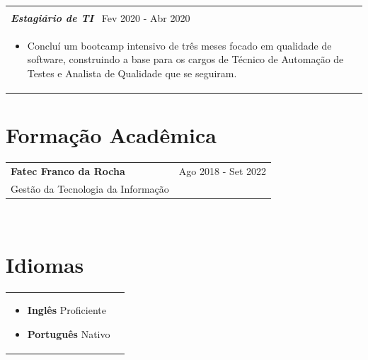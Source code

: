 \documentclass[a4paper,8pt]{article}
\begin{document}
\begin{tabularx}{\linewidth}{ @{}l r@{} }
\begin{minipage}[t]{\linewidth}
\begin{itemize}[nosep,after=\strut, leftmargin=2em, itemsep=2pt]
    \end{itemize}
\end{minipage}\\[6pt]
\color[HTML]{371e77}\textbf{\textit{Estagi\'ario de TI}}\ \hfill \color[HTML]{4B28A4} Fev 2020 - Abr 2020 \\[5pt]
\begin{minipage}[t]{\linewidth}
    \begin{itemize}[nosep,after=\strut, leftmargin=2em, itemsep=2pt]
        \item Conclu\'i um bootcamp intensivo de tr\^es meses focado em qualidade de software, construindo a base para os cargos de T\'ecnico de Automa\c{c}\~ao de Testes e Analista de Qualidade que se seguiram.
    \end{itemize}
\end{minipage}
\end{tabularx}

\section{Forma\c{c}\~ao Acad\^emica}
\begin{tabularx}{\linewidth}{ @{}l r@{} }
\color[HTML]{1C033C} \textbf{Fatec Franco da Rocha} & \hfill \color[HTML]{371e77} Ago 2018 - Set 2022 \\
\color[HTML]{371e77} Gest\~ao da Tecnologia da Informa\c{c}\~ao & \hfill \color[HTML]{4B28A4} \textit{\textbf{}} \\
\end{tabularx}\\[3pt]

\section{Idiomas}
\begin{tabularx}{\linewidth}{ @{}l r@{} }
\begin{minipage}[t]{\linewidth}
    \begin{itemize}[nosep,after=\strut, leftmargin=2em, itemsep=2pt]
        \item \textbf{Ingl\^es} Proficiente
         \item \textbf{Portugu\^es} Nativo
    \end{itemize}
    \end{minipage}
\end{tabularx}\\[3pt]

\end{document}

